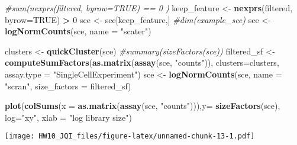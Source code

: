 \documentclass[]{article}
\newenvironment{Shaded}{\begin{snugshade}}{\end{snugshade}}
\newcommand{\KeywordTok}[1]{\textcolor[rgb]{0.13,0.29,0.53}{\textbf{#1}}}
\newcommand{\DataTypeTok}[1]{\textcolor[rgb]{0.13,0.29,0.53}{#1}}
\newcommand{\DecValTok}[1]{\textcolor[rgb]{0.00,0.00,0.81}{#1}}
\newcommand{\StringTok}[1]{\textcolor[rgb]{0.31,0.60,0.02}{#1}}
\newcommand{\CommentTok}[1]{\textcolor[rgb]{0.56,0.35,0.01}{\textit{#1}}}
\newcommand{\OtherTok}[1]{\textcolor[rgb]{0.56,0.35,0.01}{#1}}
\newcommand{\OperatorTok}[1]{\textcolor[rgb]{0.81,0.36,0.00}{\textbf{#1}}}
\newcommand{\NormalTok}[1]{#1}
\begin{document}
\begin{Shaded}
\begin{Highlighting}[]
\CommentTok{#sum(nexprs(filtered, byrow=TRUE) == 0 )}
\NormalTok{keep_feature <-}\StringTok{ }\KeywordTok{nexprs}\NormalTok{(filtered, }\DataTypeTok{byrow=}\OtherTok{TRUE}\NormalTok{) }\OperatorTok{>}\StringTok{ }\DecValTok{0}
\NormalTok{sce <-}\StringTok{ }\NormalTok{sce[keep_feature,]}
\CommentTok{#dim(example_sce)}
\NormalTok{sce <-}\StringTok{ }\KeywordTok{logNormCounts}\NormalTok{(sce, }\DataTypeTok{name =} \StringTok{"scater"}\NormalTok{)}


\NormalTok{clusters <-}\StringTok{ }\KeywordTok{quickCluster}\NormalTok{(sce)}
\CommentTok{#summary(sizeFactors(sce))}
\NormalTok{filtered_sf <-}\StringTok{ }\KeywordTok{computeSumFactors}\NormalTok{(}\KeywordTok{as.matrix}\NormalTok{(}\KeywordTok{assay}\NormalTok{(sce, }\StringTok{"counts"}\NormalTok{)), }\DataTypeTok{clusters=}\NormalTok{clusters, }\DataTypeTok{assay.type =} \StringTok{"SingleCellExperiment"}\NormalTok{)}
\NormalTok{sce <-}\StringTok{ }\KeywordTok{logNormCounts}\NormalTok{(sce, }\DataTypeTok{name =} \StringTok{"scran"}\NormalTok{, }\DataTypeTok{size_factors =}\NormalTok{ filtered_sf)}


\KeywordTok{plot}\NormalTok{(}\KeywordTok{colSums}\NormalTok{(}\DataTypeTok{x =} \KeywordTok{as.matrix}\NormalTok{(}\KeywordTok{assay}\NormalTok{(sce, }\StringTok{"counts"}\NormalTok{))),}\DataTypeTok{y=} \KeywordTok{sizeFactors}\NormalTok{(sce), }\DataTypeTok{log=}\StringTok{"xy"}\NormalTok{, }
     \DataTypeTok{xlab =} \StringTok{"log library size"}\NormalTok{)}
\end{Highlighting}
\end{Shaded}

\texttt{[image: HW10\_JQI\_files/figure-latex/unnamed-chunk-13-1.pdf]}
\end{document}
